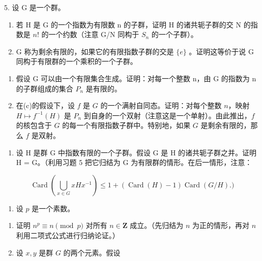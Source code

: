 5. 设 G 是一个群。

\begin{enumerate}
\def\labelenumi{(\alph{enumi})}
\item
  若 H 是 G 的一个指数为有限数 n 的子群，证明 H 的诸共轭子群的交 N 的指数是 \(n!\) 的一个约数（注意 G/N 同构于 \(S_{n}\) 的一个子群）。
\item
  G 称为剩余有限的，如果它的有限指数子群的交是 \(\{e\}\) 。证明这等价于说 G 同构于有限群的一个乘积的一个子群。
\end{enumerate}
\relax{}
\begin{enumerate}
\def\labelenumi{(\alph{enumi})}
\setcounter{enumi}{2}
\item
  假设 G 可以由一个有限集合生成。证明：对每一个整数 n，由 G 的指数为 n 的子群组成的集合 \(P_{n}\) 是有限的。
\item
  在(c)的假设下，设 \(f\) 是 \(G\) 的一个满射自同态。证明：对每个整数 \(n\)，映射 \(H \mapsto f^{-1}(H)\) 是 \(P_n\) 到自身的一个双射（注意这是一个单射）。由此推出，\(f\) 的核包含于 \(G\) 的每一个有限指数子群中。特别地，如果 \(G\) 是剩余有限的，那么 \(f\) 是双射。
\end{enumerate}

\begin{enumerate}
\def\labelenumi{\arabic{enumi}。}
\setcounter{enumi}{5}
\tightlist
\item
  设 H 是群 G 中指数有限的一个子群。假设 G 是 H 的诸共轭子群之并。证明 H = G。（利用习题 5 把它归结为 G 为有限群的情形。在后一情形，注意：
\end{enumerate}

\[
\operatorname{Card} \left(\bigcup_ {x \in G} x H x ^ {- 1}\right) \leqslant 1 + (\operatorname{Card} (H) - 1) \operatorname{Card} (G / H).)
\]

\begin{enumerate}
\def\labelenumi{\arabic{enumi}。}
\setcounter{enumi}{6}
\tightlist
\item
  设 \(p\) 是一个素数。
\end{enumerate}

\begin{enumerate}
\def\labelenumi{(\alph{enumi})}
\item
  证明 \(n^p \equiv n \pmod{p}\) 对所有 \(n \in \mathbf{Z}\) 成立。（先归结为 \(n\) 为正的情形，再对 \(n\) 利用二项式公式进行归纳论证。）
\item
  设 \(x, y\) 是群 \(G\) 的两个元素。假设
\end{enumerate}

